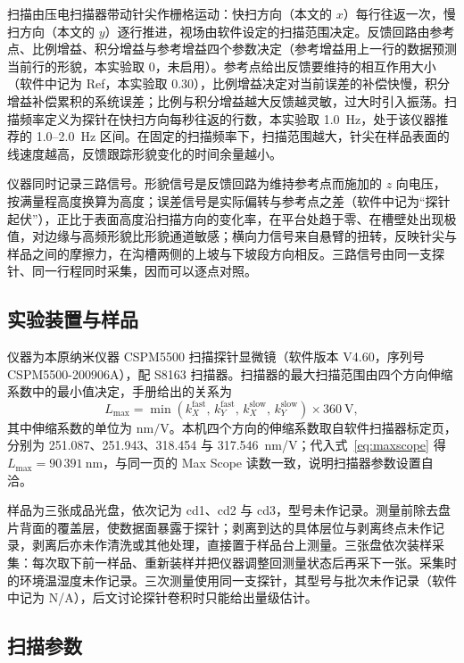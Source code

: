 \documentclass[12pt,a4paper,fontset=windows]{ctexart}
\begin{document}
扫描由压电扫描器带动针尖作栅格运动：快扫方向（本文的 $x$）每行往返一次，慢扫方向（本文的 $y$）逐行推进，视场由软件设定的扫描范围决定。反馈回路由参考点、比例增益、积分增益与参考增益四个参数决定（参考增益用上一行的数据预测当前行的形貌，本实验取 0，未启用）。参考点给出反馈要维持的相互作用大小（软件中记为 Ref，本实验取 0.30），比例增益决定对当前误差的补偿快慢，积分增益补偿累积的系统误差\cite{manual_cspm}；比例与积分增益越大反馈越灵敏，过大时引入振荡。扫描频率定义为探针在快扫方向每秒往返的行数，本实验取 1.0~Hz，处于该仪器推荐的 1.0--2.0~Hz 区间。在固定的扫描频率下，扫描范围越大，针尖在样品表面的线速度越高，反馈跟踪形貌变化的时间余量越小。

仪器同时记录三路信号。形貌信号是反馈回路为维持参考点而施加的 $z$ 向电压，按满量程高度换算为高度；误差信号是实际偏转与参考点之差（软件中记为“探针起伏”），正比于表面高度沿扫描方向的变化率，在平台处趋于零、在槽壁处出现极值，对边缘与高频形貌比形貌通道敏感；横向力信号来自悬臂的扭转，反映针尖与样品之间的摩擦力，在沟槽两侧的上坡与下坡段方向相反。三路信号由同一支探针、同一行程同时采集，因而可以逐点对照。

\subsection{实验装置与样品}

仪器为本原纳米仪器 CSPM5500 扫描探针显微镜（软件版本 V4.60，序列号 CSPM5500-200906A），配 S8163 扫描器。扫描器的最大扫描范围由四个方向伸缩系数中的最小值决定，手册给出的关系为
\begin{equation}
L_{\max} = \min\left(k_{X}^{\text{fast}},\,k_{Y}^{\text{fast}},\,k_{X}^{\text{slow}},\,k_{Y}^{\text{slow}}\right)\times 360~\mathrm{V},
\label{eq:maxscope}
\end{equation}
其中伸缩系数的单位为 $\mathrm{nm/V}$。本机四个方向的伸缩系数取自软件扫描器标定页，分别为 251.087、251.943、318.454 与 317.546~nm/V；代入式~\eqref{eq:maxscope} 得 $L_{\max}=90\,391~\mathrm{nm}$，与同一页的 Max Scope 读数一致，说明扫描器参数设置自洽。

样品为三张成品光盘，依次记为 cd1、cd2 与 cd3，型号未作记录。测量前除去盘片背面的覆盖层，使数据面暴露于探针；剥离到达的具体层位与剥离终点未作记录，剥离后亦未作清洗或其他处理，直接置于样品台上测量。三张盘依次装样采集：每次取下前一样品、重新装样并把仪器调整回测量状态后再采下一张。采集时的环境温湿度未作记录。三次测量使用同一支探针，其型号与批次未作记录（软件中记为 N/A），后文讨论探针卷积时只能给出量级估计。

\subsection{扫描参数}
\end{document}
